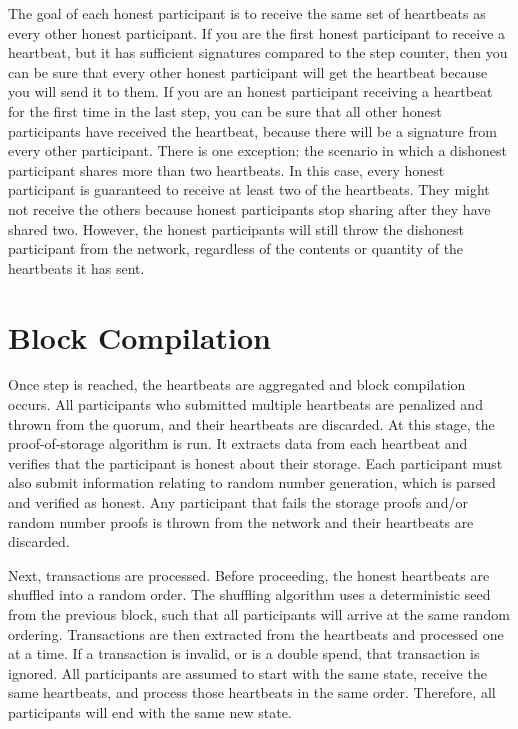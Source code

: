 \documentclass[twocolumn]{article}
\begin{document}
The goal of each honest participant is to receive the same set of heartbeats as every other honest participant.
If you are the first honest participant to receive a heartbeat, but it has sufficient signatures compared to the step counter, then you can be sure that every other honest participant will get the heartbeat because you will send it to them.
If you are an honest participant receiving a heartbeat for the first time in the last step, you can be sure that all other honest participants have received the heartbeat, because there will be a signature from every other participant.
There is one exception: the scenario in which a dishonest participant shares more than two heartbeats.
In this case, every honest participant is guaranteed to receive at least two of the heartbeats.
They might not receive the others because honest participants stop sharing after they have shared two.
However, the honest participants will still throw the dishonest participant from the network, regardless of the contents or quantity of the heartbeats it has sent.


\section{Block Compilation}
Once step \quorumsize{} is reached, the heartbeats are aggregated and block compilation occurs.
All participants who submitted multiple heartbeats are penalized and thrown from the quorum, and their heartbeats are discarded.
At this stage, the proof-of-storage algorithm is run.
It extracts data from each heartbeat and verifies that the participant is honest about their storage.
Each participant must also submit information relating to random number generation, which is parsed and verified as honest.
Any participant that fails the storage proofs and/or random number proofs is thrown from the network and their heartbeats are discarded.

Next, transactions are processed.
Before proceeding, the honest heartbeats are shuffled into a random order.
The shuffling algorithm uses a deterministic seed from the previous block, such that all participants will arrive at the same random ordering.
Transactions are then extracted from the heartbeats and processed one at a time.
If a transaction is invalid, or is a double spend, that transaction is ignored.
All participants are assumed to start with the same state, receive the same heartbeats, and process those heartbeats in the same order.
Therefore, all participants will end with the same new state.
\end{document}
